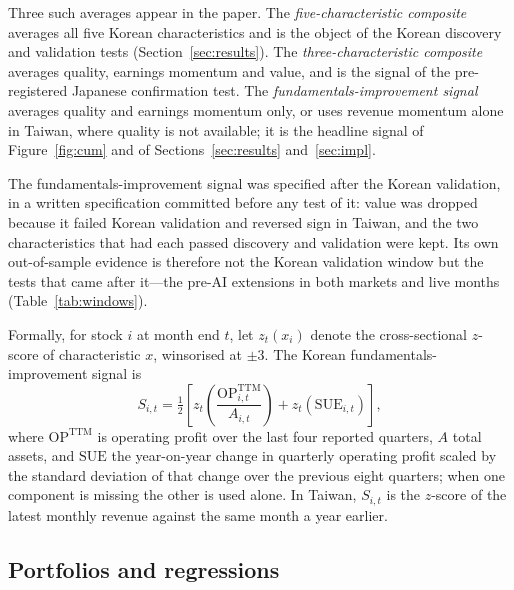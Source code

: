 \documentclass[12pt,a4paper]{article}
\begin{document}
Three such averages appear in the paper. The \emph{five-characteristic composite} averages all five Korean
characteristics and is the object of the Korean discovery and validation tests (Section~\ref{sec:results}). The
\emph{three-characteristic composite} averages quality, earnings momentum and value, and is the signal of the
pre-registered Japanese confirmation test. The \emph{fundamentals-improvement signal} averages quality and earnings
momentum only, or uses revenue momentum alone in Taiwan, where quality is not available; it is the headline signal of
Figure~\ref{fig:cum} and of Sections~\ref{sec:results} and~\ref{sec:impl}.

The fundamentals-improvement signal was specified after the Korean validation, in a written specification committed
before any test of it: value was dropped because it failed Korean validation and reversed sign in Taiwan, and the two
characteristics that had each passed discovery and validation were kept. Its own out-of-sample evidence is therefore
not the Korean validation window but the tests that came after it---the pre-AI extensions in both markets and live
months (Table~\ref{tab:windows}).

Formally, for stock $i$ at month end $t$, let $z_t(x_i)$ denote the cross-sectional $z$-score of
characteristic $x$, winsorised at $\pm 3$. The Korean fundamentals-improvement signal is
\begin{equation}
S_{i,t} = \tfrac{1}{2}\left[ z_t\!\left(\frac{\mathrm{OP}^{\mathrm{TTM}}_{i,t}}{A_{i,t}}\right) + z_t\!\left(\mathrm{SUE}_{i,t}\right)\right],
\label{eq:signal}
\end{equation}
where $\mathrm{OP}^{\mathrm{TTM}}$ is operating profit over the last four reported quarters, $A$ total assets, and
$\mathrm{SUE}$ the year-on-year change in quarterly operating profit scaled by the standard deviation of that change
over the previous eight quarters; when one component is missing the other is used alone. In Taiwan, $S_{i,t}$ is the
$z$-score of the latest monthly revenue against the same month a year earlier.

\subsection{Portfolios and regressions}
\end{document}
